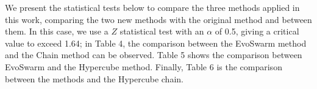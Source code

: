 \documentclass[runningheads]{llncs}
\begin{document}
We present the statistical tests below to compare the three methods
applied in this work, comparing the two new methods with the original
method and between them. In this case, we use a \(Z\) statistical test
with an $\alpha$ of 0.5, giving a critical value to exceed 1.64; %
in Table 4, the comparison between the EvoSwarm method and the Chain
method can be observed. Table 5 shows the comparison between EvoSwarm
and the Hypercube method. Finally, Table 6 is the comparison between
the methods and the Hypercube chain.\hfill \break
\end{document}
